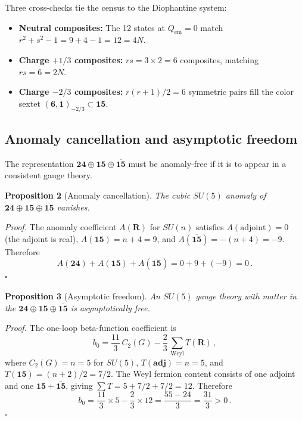 \documentclass[12pt,a4paper]{article}
\begin{document}
\noindent
Three cross-checks tie the census to the Diophantine system:
\begin{itemize}
\item \textbf{Neutral composites:} The 12 states at $Q_{\text{em}} = 0$
match $r^2 + s^2 - 1 = 9 + 4 - 1 = 12 = 4N$.
\item \textbf{Charge $+1/3$ composites:}
$rs = 3 \times 2 = 6$ composites, matching
$rs = 6 = 2N$.
\item \textbf{Charge $-2/3$ composites:}
$r(r+1)/2 = 6$ symmetric pairs fill the color sextet
$(\mathbf{6},\mathbf{1})_{-2/3} \subset \mathbf{15}$.
\end{itemize}

\subsection{Anomaly cancellation and asymptotic freedom}
The representation $\mathbf{24} \oplus \mathbf{15} \oplus
\overline{\mathbf{15}}$ must be anomaly-free if it is to appear
in a consistent gauge theory.

\medskip
\noindent\textbf{Proposition 2} (Anomaly cancellation).
\textit{The cubic $SU(5)$ anomaly of $\mathbf{24} \oplus
\mathbf{15} \oplus \overline{\mathbf{15}}$ vanishes.}

\medskip
\noindent\textit{Proof.}
The anomaly coefficient $A(\mathbf{R})$ for $SU(n)$ satisfies
$A(\text{adjoint}) = 0$ (the adjoint is real),
$A(\mathbf{15}) = n + 4 = 9$, and
$A(\overline{\mathbf{15}}) = -(n+4) = -9$.  Therefore
\[
A(\mathbf{24}) + A(\mathbf{15}) + A(\overline{\mathbf{15}})
= 0 + 9 + (-9) = 0\,.
\]
\hfill$\square$

\medskip
\noindent\textbf{Proposition 3} (Asymptotic freedom).
\textit{An $SU(5)$ gauge theory with matter in the
$\mathbf{24} \oplus \mathbf{15} \oplus \overline{\mathbf{15}}$
is asymptotically free.}

\medskip
\noindent\textit{Proof.}
The one-loop beta-function coefficient is
\[
b_0 = \frac{11}{3}\,C_2(G) - \frac{2}{3}\,\sum_{\text{Weyl}} T(\mathbf{R})\,,
\]
where $C_2(G) = n = 5$ for $SU(5)$, $T(\mathbf{adj}) = n = 5$,
and $T(\mathbf{15}) = (n+2)/2 = 7/2$.  The Weyl fermion content
consists of one adjoint and one $\mathbf{15} + \overline{\mathbf{15}}$,
giving
$\sum T = 5 + 7/2 + 7/2 = 12$.  Therefore
\[
b_0 = \frac{11}{3} \times 5 - \frac{2}{3} \times 12
= \frac{55 - 24}{3} = \frac{31}{3} > 0\,.
\]
\hfill$\square$
\end{document}
